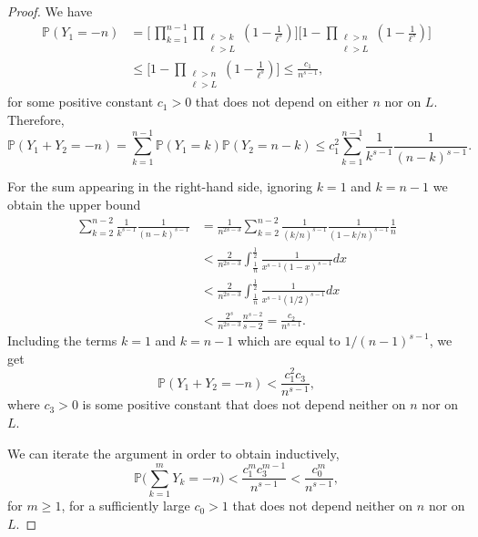 \documentclass[a4paper,oneside,12pt]{amsart}
\renewcommand{\leq}{\leqslant}
\renewcommand{\geq}{\geqslant}
\theoremstyle{plain}
\theoremstyle{definition}
\theoremstyle{remark}
\renewcommand{\P}{\mathbb{P}}
\begin{document}
\begin{proof}
We have
\begin{align*}
\P\left( Y_1 = -n  \right) &= \bigg[\, \prod_{k = 1}^{n-1}\prod_{\substack{\ell > k \\ \ell > L }} \left(1 - \frac{1}{\ell^s} \right) \bigg] \bigg[ 1 - \prod_{\substack{\ell > n \\ \ell > L }} \left(1 - \frac{1}{\ell^s} \right) \bigg] \\
&\leq  \bigg[ 1 - \prod_{\substack{\ell > n \\ \ell > L }} \left(1 - \frac{1}{\ell^s} \right) \bigg] \leq \frac{c_1}{n^{s-1}},
\end{align*}
for some positive constant $c_1 > 0$ that does not depend on either $n$ nor on $L$.
Therefore,
\begin{equation*}
\P\left( Y_1+Y_2 = -n  \right) = \sum_{k=1}^{n-1} \P\left( Y_1 = k  \right) \P\left( Y_2 = n-k  \right) \leq c_1^2 \sum_{k=1}^{n-1} \frac{1}{k^{s-1}}\frac{1}{(n-k)^{s-1}}.
\end{equation*}

For the sum appearing in the right-hand side, ignoring $k=1$ and $k=n-1$ we obtain the upper bound
\begin{align*}
\sum_{k=2}^{n-2} \frac{1}{k^{s-1}} \frac{1}{(n-k)^{s-1}} &= \frac{1}{n^{2s-3}} \sum_{k=2}^{n-2} \frac{1}{(k/n)^{s-1}}\frac{1}{(1 - k/n)^{s-1}}\frac{1}{n}\\ 
&<  \frac{2}{n^{2s-3}} \int_{\frac{1}{n}}^{\frac{1}{2}} \frac{1}{x^{s-1}(1-x)^{s-1}} dx \\
&<  \frac{2}{n^{2s-3}} \int_{\frac{1}{n}}^{\frac{1}{2}} \frac{1}{x^{s-1}(1/2)^{s-1}} dx \\
&< \frac{2^s}{n^{2s-3}}\frac{n^{s-2}}{s-2} = \frac{c_2}{n^{s-1}}.
\end{align*}
Including the terms $k=1$ and $k=n-1$ which are equal to $1/(n-1)^{s-1}$, we get   
\begin{equation*}
\P\left( Y_1+Y_2 = -n  \right) < \frac{c_1^2 c_3}{n^{s-1}},
\end{equation*}
where $c_3 > 0$ is some positive constant that does not depend neither on $n$ nor on $L$.

We can iterate the argument in order to obtain inductively,
\begin{equation*}
\P\bigg( \sum_{k=1}^m Y_k = -n  \bigg) < \frac{c_1^m c_3^{m-1}}{n^{s-1}} <  \frac{c_0^m}{n^{s-1}},
\end{equation*}
for $m \geq 1$, for a sufficiently large $c_0 > 1$ that does not depend neither on $n$ nor on $L$.
\end{proof}
\end{document}
